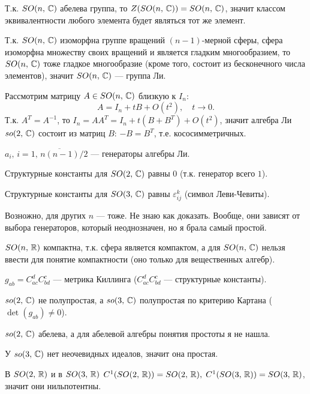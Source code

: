 \documentclass[a4paper,12pt]{article}
\begin{document}
	Т.к. $SO(n,\,\mathbb{C})$ абелева группа, то $ Z( SO(n,\,\mathbb{C}))= SO(n,\,\mathbb{C}) $,
	значит классом эквивалентности любого элемента будет являться тот же
	элемент.

	Т.к. $SO(n,\,\mathbb{C})$ изоморфна группе вращений $(n-1)$-мерной сферы,
	сфера изоморфна множеству своих вращений и является гладким
	многообразием, то $SO(n,\,\mathbb{C})$ тоже гладкое многообразие (кроме того,
	состоит из бесконечного числа элементов), значит  $SO(n,\,\mathbb{C})$
	--- группа Ли.

	Рассмотрим матрицу $ A\in SO(n,\,\mathbb{C}) $ близкую к $I_n$:
	\begin{equation}
		 A=I_n+tB+O(t^{2}),\quad t \to  0 
	.\end{equation}
	Т.к. $ A^{T}=A^{-1} $, то $ I_n=AA^{T}=I_n+t(B+B^{T})+
	O(t^{2})$, значит алгебра Ли $so(2,\,\mathbb{C})$ состоит из матриц $B$:
	$ -B=B^{T} $, т.е. кососимметричных.

	$ a_{i},\, i=\overline{1,\, n(n-1) /2} $ --- генераторы алгебры Ли.

	Структурные константы для $SO(2,\,\mathbb{C})$ равны $0$ (т.к. генератор всего
	$1$).

	Структурные константы для $SO(3,\,\mathbb{C})$ равны $ \varepsilon_{ij}^{k} $
	(символ Леви-Чевиты).

	Возножно, для других $n$ --- тоже. Не знаю как доказать. Вообще, они
	зависят от выбора генераторов, который неоднозначен, но я брала самый
	простой.
	
	$SO(n,\,\mathbb{R})$ компактна, т.к. сфера является компактом, а для
	$SO(n,\,\mathbb{C})$ нельзя ввести для понятие компактности (оно только для
	вещественных алгебр).
	
	$ g_{ab}=C^{d}_{ac}C^{c}_{bd} $ --- метрика Киллинга
	($ C^{d}_{ac}C^{c}_{bd} $ --- структурные константы).

	$so(2,\,\mathbb{C})$ не полупростая, а $so(3,\,\mathbb{C})$ полупростая по критерию
	Картана ($ \det(g_{ab})\neq0 $).

	$so(2,\,\mathbb{C})$ абелева, а для абелевой алгебры понятия простоты я не
	нашла.

	У $so(3,\,\mathbb{C})$ нет неочевидных идеалов, значит она простая.

	В $SO(2,\,\mathbb{R})$ и в $SO(3,\,\mathbb{R})$ $ C^1(SO(2,\,\mathbb{R}))=SO(2,\,\mathbb{R}),\;
	C^1(SO(3,\,\mathbb{R}))=SO(3,\,\mathbb{R})$, значит они нильпотентны.
\end{document}
